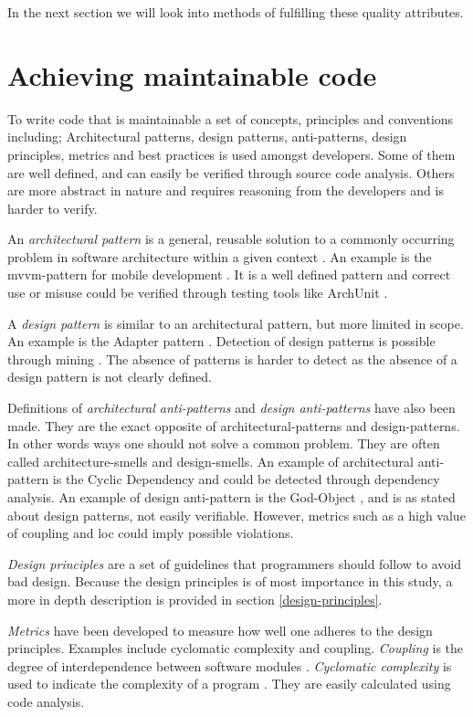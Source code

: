 \documentclass{report}
\begin{document}
In the next section we will look into methods of fulfilling these quality attributes.

\section{Achieving maintainable code}
To write code that is maintainable a set of concepts, principles and conventions including; Architectural patterns, design patterns, anti-patterns, design principles, metrics and best practices is used amongst developers. Some of them are well defined, and can easily be verified through source code analysis. Others are more abstract in nature and requires reasoning from the developers and is harder to verify.

An \textit{architectural pattern} is a general, reusable solution to a commonly occurring problem in software architecture within a given context \cite{architecturalpattern}. An example is the \gls{mvvm}-pattern for mobile development \cite{mvvm}. It is a well defined pattern and correct use or misuse could be verified through testing tools like ArchUnit \cite{archunit}. 

A \textit{design pattern} is similar to an architectural pattern, but more limited in scope. An example is the Adapter pattern \cite{Adapterp54:online}. Detection of design patterns is possible through mining \cite{TEKIN2014406}. The absence of patterns is harder to detect as the absence of a design pattern is not clearly defined.

Definitions of \textit{architectural anti-patterns} and \textit{design anti-patterns} have also been made. They are the exact opposite of architectural-patterns and design-patterns. In other words ways one should not solve a common problem. They are often called architecture-smells and design-smells. An example of architectural anti-pattern is the Cyclic Dependency \cite{cyclicdependency} and could be detected through dependency analysis. An example of design anti-pattern is the God-Object \cite{Godobjec14:online}, and is as stated about design patterns, not easily verifiable. However, metrics such as a high value of coupling and \gls{loc} could imply possible violations.


\textit{Design principles} are a set of guidelines that programmers should follow to avoid bad design. Because the design principles is of most importance in this study, a more in depth description is provided in section \ref{design-principles}.

\textit{Metrics} have been developed to measure how well one adheres to the design principles. Examples include cyclomatic complexity and coupling. \textit{Coupling} is the degree of interdependence between software modules \cite{Coupling2:online}. \textit{Cyclomatic complexity} is used to indicate the complexity of a program \cite{Cyclomat54:online}. They are easily calculated using code analysis.
\end{document}
